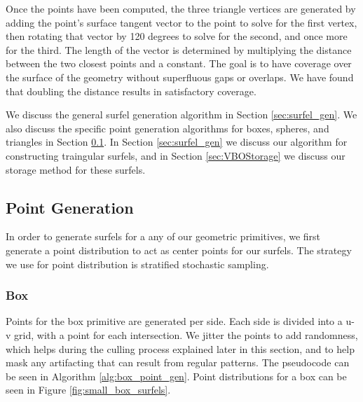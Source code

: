 Once the points have been computed, the three triangle vertices are generated by adding the point's surface tangent vector to the point to solve for the first vertex, then rotating that vector by 120 degrees to solve for the second, and once more for the third. The length of the vector is determined by multiplying the distance between the two closest points and a constant. The goal is to have coverage over the surface of the geometry without superfluous gaps or overlaps. We have found that doubling the distance results in satisfactory coverage.

We discuss the general surfel generation algorithm in Section \ref{sec:surfel_gen}. We also discuss the specific point generation algorithms for boxes, spheres, and triangles in Section \ref{sec:point_gen}. In Section \ref{sec:surfel_gen} we discuss our algorithm for constructing traingular surfels, and in Section \ref{sec:VBOStorage} we discuss our storage method for these surfels.

\subsection{Point Generation}
\label{sec:point_gen}

In order to generate surfels for a any of our geometric primitives, we first generate a point distribution to act as center points for our surfels. The strategy we use for point distribution is stratified stochastic sampling.

\subsubsection{Box}
\label{sec:box_point_gen}
Points for the box primitive are generated per side. Each side is divided into a u-v grid, with a point for each intersection. We jitter the points to add randomness, which helps during the culling process explained later in this section, and to help mask any artifacting that can result from regular patterns. The pseudocode can be seen in Algorithm \ref{alg:box_point_gen}. Point distributions for a box can be seen in Figure \ref{fig:small_box_surfels}.

